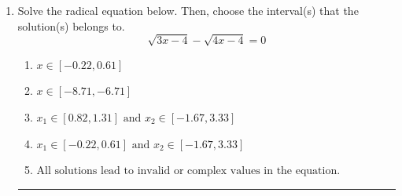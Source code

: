 \documentclass[14pt]{extbook}
\newcommand{\litem}[1]{\item#1\hspace*{-1cm}\rule{\textwidth}{0.4pt}}
\begin{document}
\begin{enumerate}
{\begin{enumerate}[label=\Alph*.]
\end{enumerate} }
\litem{
Solve the radical equation below. Then, choose the interval(s) that the solution(s) belongs to.\[ \sqrt{3 x - 4} - \sqrt{4 x - 4} = 0 \]\begin{enumerate}[label=\Alph*.]
\item \( x \in [-0.22,0.61] \)
\item \( x \in [-8.71,-6.71] \)
\item \( x_1 \in [0.82, 1.31] \text{ and } x_2 \in [-1.67,3.33] \)
\item \( x_1 \in [-0.22, 0.61] \text{ and } x_2 \in [-1.67,3.33] \)
\item \( \text{All solutions lead to invalid or complex values in the equation.} \)

\end{enumerate} }
\end{enumerate}
\end{document}
